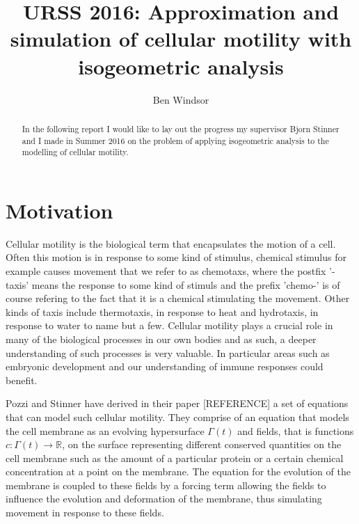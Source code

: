 \documentclass[a4paper, 11pt]{article}
\title{URSS 2016: Approximation and simulation of cellular motility with isogeometric analysis}
\author{Ben Windsor}
\date{}
\begin{document}
\maketitle

\begin{abstract}
  In the following report I would like to lay out the progress my supervisor Bjorn Stinner and I made in Summer 2016 on the problem of applying isogeometric analysis to the modelling of cellular motility. 
\end{abstract}

\pagebreak
\section{Motivation}
Cellular motility is the biological term that encapsulates the motion of a cell. Often this motion is in response to some kind of stimulus, chemical stimulus for example causes movement that we refer to as chemotaxs, where the postfix '-taxis' means the response to some kind of stimuls and the prefix 'chemo-' is of course refering to the fact that it is a chemical stimulating the movement. Other kinds of taxis include thermotaxis, in response to heat and hydrotaxis, in response to water to name but a few. Cellular motility plays a crucial role in many of the biological processes in our own bodies and as such, a deeper understanding of such processes is very valuable. In particular areas such as embryonic development and our understanding of immune responses could benefit.

Pozzi and Stinner have derived in their paper [REFERENCE] a set of equations that can model such cellular motility. They comprise of an equation that models the cell membrane as an evolving hypersurface $\Gamma(t)$ and fields, that is functions $c:\Gamma(t)\rightarrow\mathbb{R}$, on the surface representing different conserved quantities on the cell membrane such as the amount of a particular protein or a certain chemical concentration at a point on the membrane. The equation for the evolution of the membrane is coupled to these fields by a forcing term allowing the fields to influence the evolution and deformation of the membrane, thus simulating movement in response to these fields. 
\end{document}
